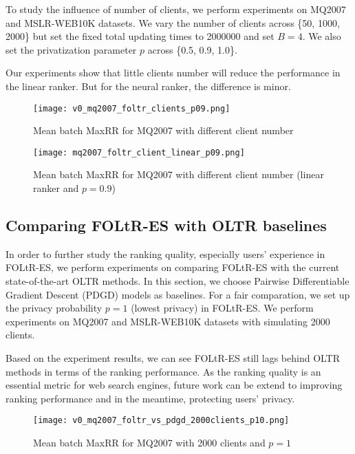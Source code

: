 To study the influence of number of clients, we perform experiments on MQ2007 and MSLR-WEB10K datasets. We vary the number of clients across \{50, 1000, 2000\} but set the fixed total updating times to 2000000 and set $B = 4$. We also set the privatization parameter $p$ across \{0.5, 0.9, 1.0\}.

Our experiments show that little clients number will reduce the performance in the linear ranker. But for the neural ranker, the difference is minor.

\begin{figure}[H]
	\centering
	\texttt{[image: v0\_mq2007\_foltr\_clients\_p09.png]}
	\caption{Mean batch MaxRR for MQ2007 with different client number}
	\label{fig: mq2007clients}
\end{figure}
\begin{figure}[H]
	\centering
	\texttt{[image: mq2007\_foltr\_client\_linear\_p09.png]}
	\caption{Mean batch MaxRR for MQ2007 with different client number (linear ranker and $p = 0.9$)}
	\label{fig: mq2007-rq2-0.9}
\end{figure}

\subsection{Comparing FOLtR-ES with OLTR baselines}

In order to further study the ranking quality, especially users' experience in FOLtR-ES, we perform experiments on comparing FOLtR-ES with the current state-of-the-art OLTR methods. In this section, we choose Pairwise Differentiable Gradient Descent (PDGD) models as baselines. For a fair comparation, we set up the privacy probability $p = 1$ (lowest privacy) in FOLtR-ES. We perform experiments on MQ2007 and MSLR-WEB10K datasets with simulating 2000 clients.

Based on the experiment results, we can see FOLtR-ES still lags behind OLTR methods in terms of the ranking performance. As the ranking quality is an essential metric for web search engines, future work can be extend to improving ranking performance and in the meantime, protecting users' privacy.

\begin{figure}[H]
	\centering
	\texttt{[image: v0\_mq2007\_foltr\_vs\_pdgd\_2000clients\_p10.png]}
	\caption{Mean batch MaxRR for MQ2007 with 2000 clients and $p = 1$}
	\label{fig: mq2007-v0-baseline}
\end{figure}

